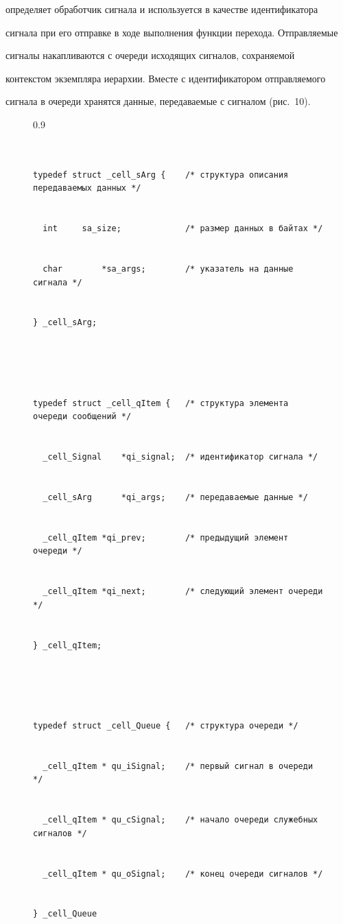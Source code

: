 определяет обработчик сигнала и используется в качестве идентификатора 


сигнала при его отправке в ходе выполнения функции перехода. Отправляемые 


сигналы накапливаются с очереди исходящих сигналов, сохраняемой 


контекстом экземпляра иерархии. Вместе с идентификатором отправляемого 


сигнала в очереди хранятся данные, передаваемые с сигналом (рис.~10). 








\begin{figure}\scriptsize %


\begin{center}


\begin{fmpage}{0.9\textwidth}


\begin{verbatim}


typedef struct _cell_sArg {    /* структура описания передаваемых данных */ 


  int     sa_size;             /* размер данных в байтах */ 


  char        *sa_args;        /* указатель на данные сигнала */ 


} _cell_sArg; 


 


typedef struct _cell_qItem {   /* структура элемента очереди сообщений */ 


  _cell_Signal    *qi_signal;  /* идентификатор сигнала */ 


  _cell_sArg      *qi_args;    /* передаваемые данные */ 


  _cell_qItem *qi_prev;        /* предыдущий элемент очереди */ 


  _cell_qItem *qi_next;        /* следующий элемент очереди */ 


} _cell_qItem; 


 


typedef struct _cell_Queue {   /* структура очереди */ 


  _cell_qItem * qu_iSignal;    /* первый сигнал в очереди */ 


  _cell_qItem * qu_cSignal;    /* начало очереди служебных сигналов */ 


  _cell_qItem * qu_oSignal;    /* конец очереди сигналов */ 


} _cell_Queue


\end{verbatim}


\end{fmpage}


\end{center}


\vspace*{-6pt}




\end{figure}





